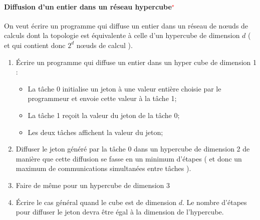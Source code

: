 \documentclass[11pt,a4paper]{article}
\begin{document}



\paragraph{Diffusion d'un entier dans un réseau hypercube\textcolor{red}{$^{\star}$}}

On veut écrire un programme qui diffuse un entier dans un réseau de n{\oe}uds de calculs dont la topologie
est équivalente à celle d'un hypercube de dimension $d$ ( et qui contient donc $2^{d}$ n{\oe}uds de calcul ).

\begin{enumerate}
\item \'Ecrire un programme qui diffuse un entier dans un hyper cube de dimension 1 :
\begin{itemize}
\item La tâche 0 initialise un jeton à une valeur entière choisie par le programmeur et envoie cette valeur 
à la tâche 1; 
\item La tâche 1 reçoit la valeur du jeton de la tâche 0;
\item Les deux tâches affichent la valeur du jeton;
\end{itemize}
\item Diffuser le jeton généré par la tâche 0 dans un hypercube de dimension 2 de manière que cette diffusion se fasse en un minimum
d'étapes ( et donc un maximum de communications simultanées entre tâches ).
\item Faire de même pour un hypercube de dimension 3
\item \'Ecrire le cas général quand le cube est de dimension $d$. Le nombre d'étapes pour diffuser le jeton devra
être égal à la dimension de l'hypercube.
\end{enumerate}
\end{document}
